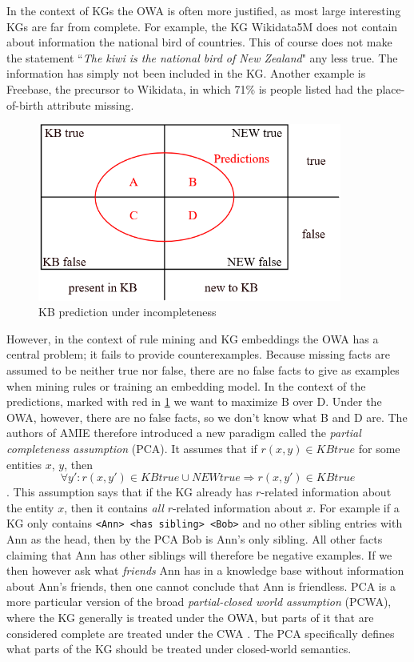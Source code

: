 In the context of KGs the OWA is often more justified, as most large interesting KGs are far from complete. For example, the KG Wikidata5M does not contain about information the national bird of countries. This of course does not make the statement ``\textit{The kiwi is the national bird of New Zealand}" any less true. The information has simply not been included in the KG. Another example is Freebase, the precursor to Wikidata, in which 71\% is people listed had the place-of-birth attribute missing.

\begin{figure}[htp]
    \centering
    \includegraphics[width=10cm]{figures/kb_venn.png}
    \caption{KB prediction under incompleteness}
    \label{KB_predictions}
\end{figure}

However, in the context of rule mining and KG embeddings the OWA has a central problem; it fails to provide counterexamples. Because missing facts are assumed to be neither true nor false, there are no false facts to give as examples when mining rules or training an embedding model. In the context of the predictions, marked with red in \cref{KB_predictions} we want to maximize B over D. Under the OWA, however, there are no false facts, so we don't know what B and D are. The authors of AMIE therefore introduced a new paradigm called the \textit{partial completeness assumption} (PCA). It assumes that if $r(x, y) \in KB true$ for some entities $x$, $y$, then
\[\forall y' : r(x, y') \in KBtrue \cup NEWtrue \Rightarrow r(x, y') \in KBtrue\].
This assumption says that if the KG already has $r$-related information about the entity $x$,  then it contains \textit{all} $r$-related information about $x$. For example if a KG only contains \texttt{<Ann> <has sibling> <Bob>} and no other sibling entries with Ann as the head, then by the PCA Bob is Ann's only sibling. All other facts claiming that Ann has other siblings will therefore be negative examples. If we then however ask what \textit{friends} Ann has in a knowledge base without information about Ann's friends, then one cannot conclude that Ann is friendless. PCA is a more particular version of the broad \textit{partial-closed world assumption} (PCWA), where the KG generally is treated under the OWA, but parts of it that are considered complete are treated under the CWA \cite{motro1989integrity}. The PCA specifically defines what parts of the KG should be treated under closed-world semantics.



